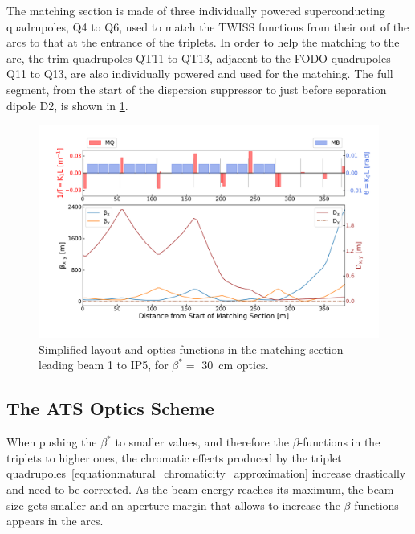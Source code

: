 The matching section is made of three individually powered superconducting quadrupoles, Q\num{4} to Q\num{6}, used to match the TWISS functions from their out of the arcs to that at the entrance of the triplets.
In order to help the matching to the arc, the trim quadrupoles QT\num{11} to QT\num{13}, adjacent to the FODO quadrupoles Q\num{11} to Q\num{13}, are also individually powered and used for the matching.
The full segment, from the start of the dispersion suppressor to just before separation dipole D\num{2}, is shown in \cref{figure:lhc_matching_section}.

\begin{figure}[!hbt]
  \centering
  \includegraphics*[width=0.99\linewidth]{Figures/Optics_Measurements_Corrections_at_LHC/lhc_matching_section.pdf}
  \caption{Simplified layout and optics functions in the matching section leading beam \num{1} to IP\num{5}, for \(\beta^{\ast} =\) \qty{30}{\centi\meter} optics.}
  \label{figure:lhc_matching_section}
\end{figure}

\subsection{The ATS Optics Scheme}
\label{subsection:lhc_ats_optics_scheme}

When pushing the \(\beta^{\ast}\) to smaller values, and therefore the \(\beta\)-functions in the triplets to higher ones, the chromatic effects produced by the triplet quadrupoles~\cref{equation:natural_chromaticity_approximation} increase drastically and need to be corrected.
As the beam energy reaches its maximum, the beam size gets smaller and an aperture margin that allows to increase the \(\beta\)-functions appears in the arcs.

